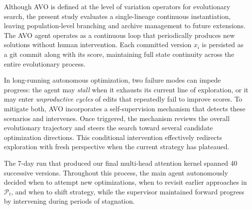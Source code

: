 Although AVO is defined at the level of variation operators for evolutionary search, the present study evaluates a single-lineage continuous instantiation, leaving population-level branching and archive management to future extensions.
The AVO agent operates as a continuous loop that periodically produces new solutions without human intervention.
Each committed version $x_i$ is persisted as a git commit along with its score, maintaining full state continuity across the entire evolutionary process.

In long-running autonomous optimization, two failure modes can impede progress: the agent may \emph{stall} when it exhausts its current line of exploration, or it may enter \emph{unproductive cycles} of edits that repeatedly fail to improve scores.
To mitigate both, AVO incorporates a self-supervision mechanism that detects these scenarios and intervenes. Once triggered, the mechanism reviews the overall evolutionary trajectory and steers the search toward several candidate optimization directions. This conditional intervention effectively redirects exploration with fresh perspective when the current strategy has plateaued.

The 7-day run that produced our final multi-head attention kernel spanned 40 successive versions. Throughout this process, the main agent autonomously decided when to attempt new optimizations, when to revisit earlier approaches in $\mathcal{P}_t$, and when to shift strategy, while the supervisor maintained forward progress by intervening during periods of stagnation.
